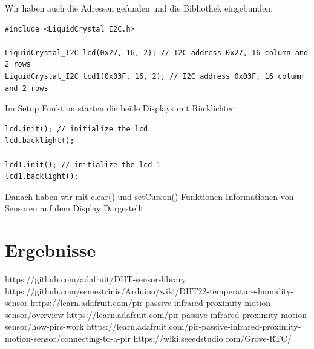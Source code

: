 \documentclass[conference]{IEEEtran}
\begin{document}
Wir haben auch die Adressen gefunden und die Bibliothek eingebunden.
\begin{lstlisting}[style=CStyle]
#include <LiquidCrystal_I2C.h>

LiquidCrystal_I2C lcd(0x27, 16, 2); // I2C address 0x27, 16 column and 2 rows
LiquidCrystal_I2C lcd1(0x03F, 16, 2); // I2C address 0x03F, 16 column and 2 rows
\end{lstlisting}\textbf{}

Im Setup Funktion starten die beide Displays mit Rücklichter.

\begin{lstlisting}[style=CStyle]
lcd.init(); // initialize the lcd
lcd.backlight();

lcd1.init(); // initialize the lcd 1
lcd1.backlight();
\end{lstlisting}\textbf{}

Danach haben wir mit clear() und setCurson() Funktionen Informationen von Sensoren auf dem Display Dargestellt.


\section{Ergebnisse}





\begin{thebibliography}{00}
 https://github.com/adafruit/DHT-sensor-library
 https://github.com/semestrinis/Arduino/wiki/DHT22-temperature-humidity-sensor
 https://learn.adafruit.com/pir-passive-infrared-proximity-motion-sensor/overview
 https://learn.adafruit.com/pir-passive-infrared-proximity-motion-sensor/how-pirs-work
 https://learn.adafruit.com/pir-passive-infrared-proximity-motion-sensor/connecting-to-a-pir
 https://wiki.seeedstudio.com/Grove-RTC/
\end{thebibliography}
\vspace{12pt}
\end{document}
